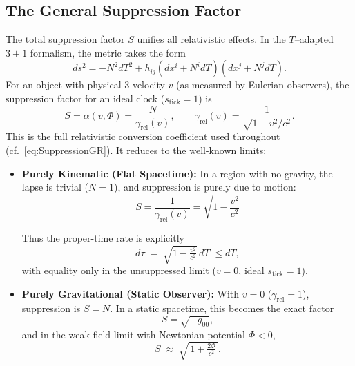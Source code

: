 \documentclass[12pt]{article}
\theoremstyle{plain} %
\newcommand{\gammarel}{\gamma_{\!\mathrm{rel}}}
\begin{document}
\subsection*{The General Suppression Factor}
The total suppression factor $S$ unifies all relativistic effects. In the $T$–adapted $3{+}1$ formalism, the metric takes the form
\begin{equation}
ds^2 = -N^2 dT^2 + h_{ij}(dx^i + N^i dT)(dx^j + N^j dT).
\label{eq:ADMmetric}
\end{equation}
For an object with physical 3-velocity $v$ (as measured by Eulerian observers), the suppression factor for an ideal clock ($s_{\text{tick}}=1$) is
\begin{equation}
S = \alpha(v,\Phi) = \frac{N}{\gammarel(v)}, 
\qquad \gammarel(v)=\frac{1}{\sqrt{1-v^2/c^2}}.
\label{eq:GeneralSuppression}
\end{equation}
This is the full relativistic conversion coefficient used throughout (cf.~\eqref{eq:SuppressionGR}). It reduces to the well-known limits:
\begin{itemize}
    \item \textbf{Purely Kinematic (Flat Spacetime):} In a region with no gravity, the lapse is trivial ($N=1$), and suppression is purely due to motion:
    \begin{equation}
        S = \frac{1}{\gammarel(v)} = \sqrt{1-\frac{v^2}{c^2}}
        \label{eq:KinematicSuppression}
    \end{equation}
    
    Thus the proper-time rate is explicitly
    \begin{equation}
        d\tau \;=\; \sqrt{1-\tfrac{v^2}{c^2}}\, dT \;\le dT,
        \label{eq:dtauKinematic}
    \end{equation}
    with equality only in the unsuppressed limit ($v=0$, ideal $s_{\mathrm{tick}}=1$).

    \item \textbf{Purely Gravitational (Static Observer):} With $v=0$ ($\gammarel=1$), suppression is $S=N$. In a static spacetime, this becomes the exact factor
    \begin{equation}
        S=\sqrt{-g_{00}},
        \label{eq:SuppressionGR}
    \end{equation}
    and in the weak-field limit with Newtonian potential $\Phi<0$,
    \begin{equation}
        S \;\approx\; \sqrt{\,1+\tfrac{2\Phi}{c^2}\,}.
        \label{eq:SuppressionNewton}
    \end{equation}

\end{itemize}
\end{document}
